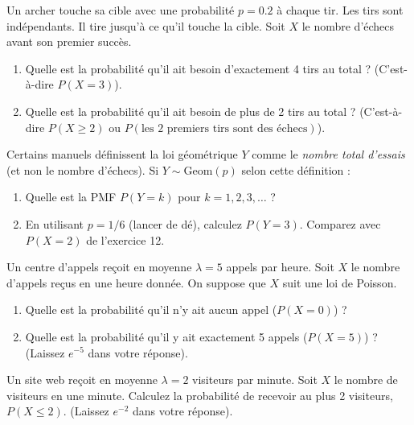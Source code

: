\begin{exercicebox}
Un archer touche sa cible avec une probabilité $p=0.2$ à chaque tir. Les tirs sont indépendants. Il tire jusqu'à ce qu'il touche la cible. Soit $X$ le nombre d'échecs avant son premier succès.
\begin{enumerate}
    \item Quelle est la probabilité qu'il ait besoin d'exactement 4 tirs au total ? (C'est-à-dire $P(X=3)$).
    \item Quelle est la probabilité qu'il ait besoin de plus de 2 tirs au total ? (C'est-à-dire $P(X \ge 2)$ ou $P(\text{les 2 premiers tirs sont des échecs})$).
\end{enumerate}
\end{exercicebox}

\begin{exercicebox}
Certains manuels définissent la loi géométrique $Y$ comme le \textit{nombre total d'essais} (et non le nombre d'échecs). Si $Y \sim \text{Geom}(p)$ selon cette définition :
\begin{enumerate}
    \item Quelle est la PMF $P(Y=k)$ pour $k=1, 2, 3, \dots$ ?
    \item En utilisant $p=1/6$ (lancer de dé), calculez $P(Y=3)$. Comparez avec $P(X=2)$ de l'exercice 12.
\end{enumerate}
\end{exercicebox}


\begin{exercicebox}
Un centre d'appels reçoit en moyenne $\lambda = 5$ appels par heure. Soit $X$ le nombre d'appels reçus en une heure donnée. On suppose que $X$ suit une loi de Poisson.
\begin{enumerate}
    \item Quelle est la probabilité qu'il n'y ait aucun appel ($P(X=0)$) ?
    \item Quelle est la probabilité qu'il y ait exactement 5 appels ($P(X=5)$) ? (Laissez $e^{-5}$ dans votre réponse).
\end{enumerate}
\end{exercicebox}

\begin{exercicebox}
Un site web reçoit en moyenne $\lambda = 2$ visiteurs par minute. Soit $X$ le nombre de visiteurs en une minute.
Calculez la probabilité de recevoir au plus 2 visiteurs, $P(X \le 2)$. (Laissez $e^{-2}$ dans votre réponse).
\end{exercicebox}

